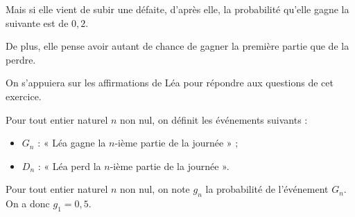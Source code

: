 \documentclass[11pt,a4paper]{article}
\newcounter{question}
\begin{document}
Mais si elle vient de subir une défaite, d'après elle, la probabilité qu'elle gagne la suivante est de $0{,}2$.

De plus, elle pense avoir autant de chance de gagner la première partie que de la perdre.

On s'appuiera sur les affirmations de Léa pour répondre aux questions de cet exercice.

Pour tout entier naturel $n$ non nul, on définit les événements suivants :
\begin{itemize}
  \item $G_n$ : « Léa gagne la $n$-ième partie de la journée » ;
  \item $D_n$ : « Léa perd la $n$-ième partie de la journée ».
\end{itemize}

Pour tout entier naturel $n$ non nul, on note $g_n$ la probabilité de l'événement $G_n$. On a donc $g_1=0{,}5$.
\end{document}
